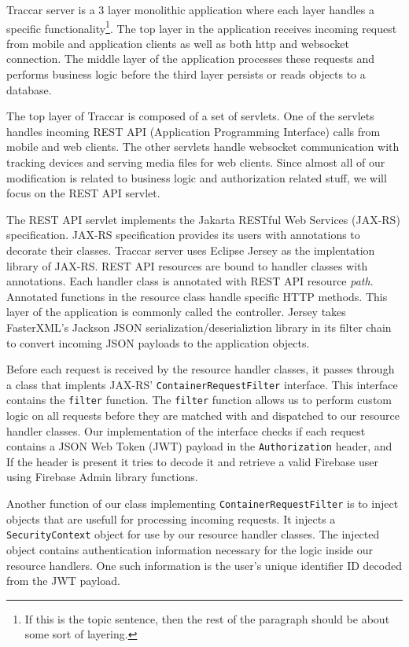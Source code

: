 \documentclass[a4paper]{article}
\begin{document}
Traccar server is a 3 layer monolithic application where each layer handles a specific functionality\footnote{
    If this is the topic sentence, then the rest of the paragraph should be about some sort of layering.
}. The top layer in the application receives incoming request from mobile and application clients as well as both http and websocket
connection. The middle layer of the application processes these requests and performs business logic before the third layer
persists or reads objects to a database. 

The top layer of Traccar is composed of a set of servlets. One of the servlets handles incoming REST API (Application Programming 
Interface) calls from mobile and web clients. The other servlets handle websocket communication with tracking devices and serving
media files for web clients. Since almost all of our modification is related to business logic and authorization related stuff,
we will focus on the REST API servlet.

The REST API servlet implements the Jakarta RESTful Web Services (JAX-RS) specification. JAX-RS specification provides its 
users with annotations to decorate their classes. Traccar server uses Eclipse Jersey as the implentation library of JAX-RS. REST API 
resources are bound to handler classes with annotations. Each handler class is annotated with REST API resource \emph{path}. Annotated 
functions in the resource class handle specific HTTP methods. This layer of the application is commonly called the controller. Jersey 
takes FasterXML's Jackson JSON serialization/deserializtion library in its filter chain to convert incoming JSON payloads to the 
application objects. 


Before each request is received by the resource handler classes, it passes through a class that implents JAX-RS' 
\lstinline{ContainerRequestFilter} interface. This interface contains the \lstinline{filter} function. 
The \lstinline{filter} function allows us to perform custom logic on all requests before they are matched with and dispatched to our 
resource handler classes. Our implementation of the interface checks if each request contains a JSON Web Token 
(JWT) payload in the \lstinline{Authorization} header, and If the header is present it tries to decode it and retrieve a valid Firebase
user using Firebase Admin library functions.

Another function of our class implementing \lstinline{ContainerRequestFilter} is to inject objects that are usefull for processing
incoming requests. It injects a \lstinline{SecurityContext} object for use by our resource handler classes. The injected object 
contains authentication information necessary for the logic inside our resource handlers. One such information is the user's unique 
identifier ID decoded from the JWT payload.
\end{document}

